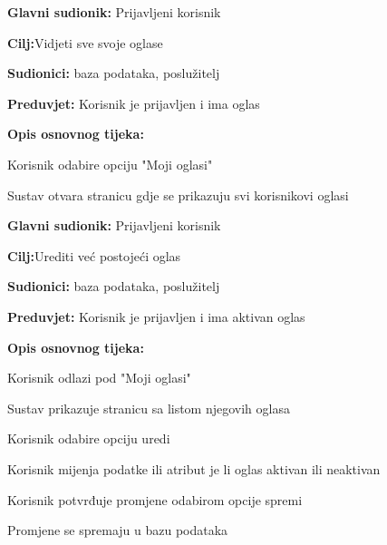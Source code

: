 \noindent {}
\begin{packed_item}
	
	\item \textbf{Glavni sudionik: }Prijavljeni korisnik
	\item  \textbf{Cilj:}Vidjeti sve svoje oglase
	\item  \textbf{Sudionici:} baza podataka, poslužitelj
	\item  \textbf{Preduvjet:} Korisnik je prijavljen i ima oglas
	\item  \textbf{Opis osnovnog tijeka:}
	
	\item[] \begin{packed_enum}
		
		\item Korisnik odabire opciju "Moji oglasi"
		\item Sustav otvara stranicu gdje se prikazuju svi korisnikovi oglasi
		
	\end{packed_enum}
\end{packed_item}

\noindent {}
\begin{packed_item}
	
	\item \textbf{Glavni sudionik: }Prijavljeni korisnik
	\item  \textbf{Cilj:}Urediti već postojeći oglas
	\item  \textbf{Sudionici:} baza podataka, poslužitelj
	\item  \textbf{Preduvjet:} Korisnik je prijavljen i ima aktivan oglas
	\item  \textbf{Opis osnovnog tijeka:}
	
	\item[] \begin{packed_enum}
		
		\item Korisnik odlazi pod "Moji oglasi" 
		\item Sustav prikazuje stranicu sa listom njegovih oglasa
		\item Korisnik odabire opciju uredi
		\item Korisnik mijenja podatke ili atribut je li oglas aktivan ili neaktivan
		\item Korisnik potvrđuje promjene odabirom opcije spremi
		\item Promjene se spremaju u bazu podataka 
		
	\end{packed_enum}
\end{packed_item}



